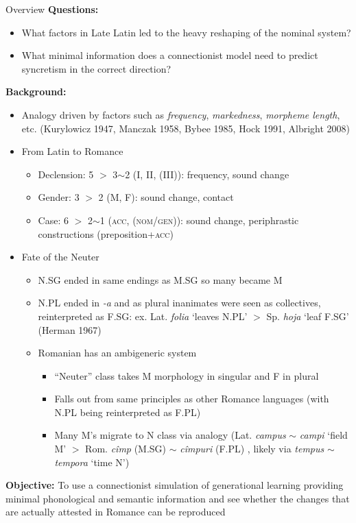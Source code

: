 \documentclass[final]{beamer}
\newlength{\onecolwid}
\newcommand{\bit}[0]{\begin{itemize}}
\newcommand{\eit}[0]{\end{itemize}}
\begin{document}
\begin{frame}[t]
\begin{columns}[t]
\begin{column}{\onecolwid}
\begin{alertblock}{Overview}
\small\textbf{Questions:} 
\bit
	\item What factors in Late Latin led to the heavy reshaping of the nominal system?
	\item What minimal information does a connectionist model need to predict syncretism in the correct direction?
\eit
\textbf{Background:}
\bit
	\item Analogy driven by factors such as \textit{frequency}, \textit{markedness}, \textit{morpheme length}, etc. (Kurylowicz 1947, Manczak 1958, Bybee 1985, Hock 1991, Albright 2008)
	\item From Latin to Romance
	\bit
		\item Declension: 5 $>$ 3$\sim$2 (I, II, (III)): frequency, sound change
		\item Gender: 3 $>$ 2 (M, F): sound change, contact
		\item Case: 6 $>$ 2$\sim$1 (\textsc{acc, (nom/gen)}): sound change, periphrastic constructions (preposition+\textsc{acc})
	\eit
	\item Fate of the Neuter
	\bit
		\item N.SG ended in same endings as M.SG so many became M
		\item N.PL ended in {\sl -a} and as plural inanimates were seen as collectives, reinterpreted as F.SG: ex. Lat. \textit{folia} `leaves N.PL' $>$ Sp. \textit{hoja} `leaf F.SG' (Herman 1967)
		\item Romanian has an ambigeneric system
		\bit
			\item ``Neuter'' class takes M morphology in singular and F in plural
			\item Falls out from same principles as other Romance languages (with N.PL being reinterpreted as F.PL)
			\item Many M's migrate to N class via analogy (Lat. \textit{campus} $\sim$ \textit{campi} `field M' $>$ Rom. \textit{c\^imp} (M.SG) $\sim$ \textit{c\^impuri} (F.PL) , likely via \textit{tempus} $\sim$ \textit{tempora} `time N')
		\eit
	\eit
\eit
\textbf{Objective:} To use a connectionist simulation of generational learning providing minimal phonological and semantic information and see whether the changes that are actually attested in Romance can be reproduced


\end{alertblock}
\end{column}
\end{columns}
\end{frame}
\end{document}
